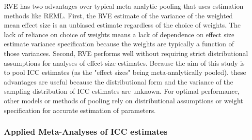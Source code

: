 




RVE has two advantages over typical meta-analytic pooling that uses estimation methods like REML. First, the RVE estimate of the variance of the weighted mean effect size is an unbiased estimate regardless of the choice of weights. The lack of reliance on choice of weights means a lack of dependence on effect size estimate variance specification because the weights are typically a function of those variances. Second, RVE performs well without requiring strict distributional assumptions for analyses of effect size estimates. Because the aim of this study is to pool ICC estimates (as the "effect sizes" being meta-analytically pooled), these advantages are useful because the distributional form and the variance of the sampling distribution of ICC estimates are unknown. For optimal performance, other models or methods of pooling rely on distributional assumptions or weight specification for accurate estimation of parameters.

\subsubsection{Applied Meta-Analyses of ICC estimates}

